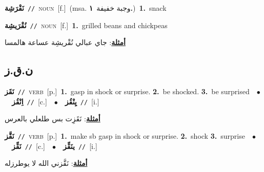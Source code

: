 \documentclass[10pt,a4paper,twoside]{article} %
\begin{document}
\begin{multicols}{2}
{\setlength\topsep{0pt}\textbf{\foreignlanguage{arabic}{نَقْرَشِة}}\ {\color{gray}\texttt{//}\color{black}}\ \textsc{noun}\ [f.]\ \color{gray}(msa. \foreignlanguage{arabic}{وجبة خفيفة}~\foreignlanguage{arabic}{\textbf{١.}})\color{black}\ \textbf{1.}~snack\ } \vspace{2mm}

{\setlength\topsep{0pt}\textbf{\foreignlanguage{arabic}{نُقْرَيشِة}}\ {\color{gray}\texttt{//}\color{black}}\ \textsc{noun}\ [f.]\ \textbf{1.}~grilled beans and chickpeas\  \begin{flushright}\color{gray}\foreignlanguage{arabic}{\textbf{\underline{\foreignlanguage{arabic}{أمثلة}}}: جاي عبالي نُقْريشِة عساعة هالمسا}\end{flushright}\color{black}} \vspace{2mm}

\vspace{-3mm}
\subsection*{\color{blue}\foreignlanguage{arabic}{ن.ق.ز}\color{blue}{}} 

{\setlength\topsep{0pt}\textbf{\foreignlanguage{arabic}{نَقَز}}\ {\color{gray}\texttt{//}\color{black}}\ \textsc{verb}\ [p.]\ \textbf{1.}~gasp in shock or surprise.  \textbf{2.}~be shocked.  \textbf{3.}~be surprised\ \ $\bullet$\ \ \setlength\topsep{0pt}\textbf{\foreignlanguage{arabic}{اِنْقُز}}\ {\color{gray}\texttt{//}\color{black}}\ [c.]\ \ $\bullet$\ \ \setlength\topsep{0pt}\textbf{\foreignlanguage{arabic}{يِنْقُز}}\ {\color{gray}\texttt{//}\color{black}}\ [i.]\  \begin{flushright}\color{gray}\foreignlanguage{arabic}{\textbf{\underline{\foreignlanguage{arabic}{أمثلة}}}: نَقَزِت بس طلعلي بالعرس}\end{flushright}\color{black}} \vspace{2mm}

{\setlength\topsep{0pt}\textbf{\foreignlanguage{arabic}{نَقَّز}}\ {\color{gray}\texttt{//}\color{black}}\ \textsc{verb}\ [p.]\ \textbf{1.}~make sb gasp in shock or surprise.  \textbf{2.}~shock  \textbf{3.}~surprise\ \ $\bullet$\ \ \setlength\topsep{0pt}\textbf{\foreignlanguage{arabic}{نَقِّز}}\ {\color{gray}\texttt{//}\color{black}}\ [c.]\ \ $\bullet$\ \ \setlength\topsep{0pt}\textbf{\foreignlanguage{arabic}{ينَقِّز}}\ {\color{gray}\texttt{//}\color{black}}\ [i.]\  \begin{flushright}\color{gray}\foreignlanguage{arabic}{\textbf{\underline{\foreignlanguage{arabic}{أمثلة}}}: نَقَّزني الله لا يوطرزله}\end{flushright}\color{black}} \vspace{2mm}


\end{multicols}
\end{document}
